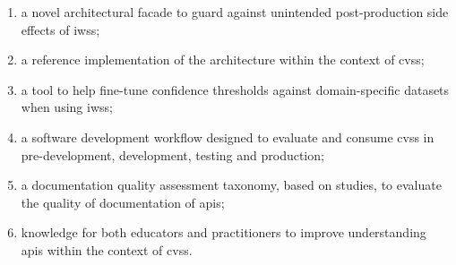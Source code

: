 \begin{enumerate}[label=(\roman*),leftmargin=2\parindent]
  \item {} a novel architectural facade to guard against unintended post-production side effects of \glspl{iws}; 
  \item {} a reference implementation of the architecture within the context of \glspl{cvs};
  \item {} a tool to help fine-tune confidence thresholds against domain-specific datasets when using \glspl{iws}; 
  \item {} a software development workflow designed to evaluate and consume \glspl{cvs} in pre-development, development, testing and production;
  \item {} a documentation quality assessment taxonomy, based on  studies, to evaluate the quality of documentation of \glspl{api};
  \item {} knowledge for both educators and practitioners to improve understanding  \glspl{api} within the context of \glspl{cvs}.
\end{enumerate}

%
%

